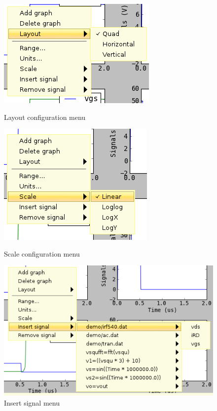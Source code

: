 \documentclass[a4paper,11pt]{article}
\begin{document}
\begin{figure}[htbp]
  \begin{minipage}{0.45\linewidth}
    \includegraphics[scale=.5]{../png/ioscopy-layout.png}
    \caption{Layout configuration menu}
    \label{fig:layout}
  \end{minipage}
  \begin{minipage}{0.45\linewidth}
    \includegraphics[scale=.5]{../png/ioscopy-scale.png}
    \caption{Scale configuration menu}
    \label{fig:scale}
  \end{minipage}

  \begin{minipage}{0.45\linewidth}
    \includegraphics[scale=.5]{../png/ioscopy-insert.png}
    \caption{Insert signal menu}
    \label{fig:insert}
  \end{minipage}

\end{figure}
\end{document}
